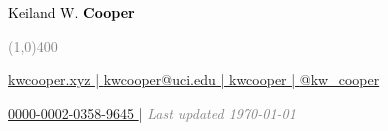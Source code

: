 \documentclass[11pt]{cooperCV_v1/cooperCV} %
\begin{document}
\begin{minipage}{\textwidth}






  

    \begin{center} %
    \huge\textcolor{black}{Keiland W.}
    \huge\textcolor{black}{\textbf{Cooper}}
    \end{center}

    \begin{center}
    \textcolor{gray}{\line(1,0){400}}
    \end{center}

    \begin{center}
    \footnotesize 
    \href{https://kwcooper.xyz}{\faHome \hspace{0.05cm} kwcooper.xyz | \hspace{0.1cm}}
    \href{mailto: kwcooper@uci.edu }{\faEnvelope \hspace{0.05cm} kwcooper@uci.edu | \hspace{0.1cm}} 
    \href{https://github.com/kwcooper}{\faGithub \hspace{0.05cm} kwcooper | \hspace{0.1cm}}
    \href{https://twitter.com/kw\_cooper}{\faTwitter \hspace{0.05cm} @kw\_cooper }  
    \end{center}

    \begin{center} 
    \footnotesize 
    \href{https://orcid.org/0000-0002-0358-9645}{\orcid \hspace{0.05cm} \footnotesize 0000-0002-0358-9645 } |
    \footnotesize \emph{\textcolor{gray}{Last updated \today }}   
    \end{center}


  




\end{minipage}
\end{document}
